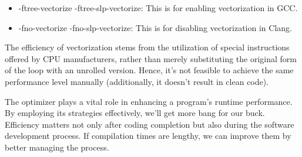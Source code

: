 \begin{itemize}
\item
-ftree-vectorize -ftree-slp-vectorize: This is for enabling vectorization in GCC.

\item
-fno-vectorize -fno-slp-vectorize: This is for disabling vectorization in Clang.
\end{itemize}

The efficiency of vectorization stems from the utilization of special instructions offered by CPU manufacturers, rather than merely substituting the original form of the loop with an unrolled version. Hence, it’s not feasible to achieve the same performance level manually (additionally, it doesn’t result in clean code).

The optimizer plays a vital role in enhancing a program’s runtime performance. By employing its strategies effectively, we’ll get more bang for our buck. Efficiency matters not only after coding completion but also during the software development process. If compilation times are lengthy, we can improve them by better managing the process.














